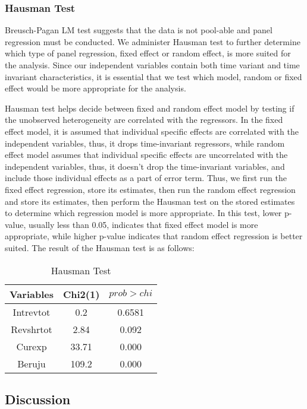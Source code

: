 \subsubsection{Hausman Test}
Breusch-Pagan LM test suggests that the data is not pool-able and panel regression must be conducted. We administer Hausman test to further determine which type of panel regression, fixed effect or random effect, is more suited for the analysis. Since our independent variables contain both time variant and time invariant characteristics, it is essential that we test which model, random or fixed effect would be more appropriate for the analysis. \par
Hausman test helps decide between fixed and random effect model by testing if the unobserved heterogeneity are correlated with the regressors. In the fixed effect model, it is assumed that individual specific effects are correlated with the independent variables, thus, it drops time-invariant regressors, while random effect model assumes that individual specific effects are uncorrelated with the independent variables, thus, it doesn't drop the time-invariant variables, and include those individual effects as a part of error term. Thus, we first run the fixed effect regression, store its estimates, then run the random effect regression and store its estimates, then perform the Hausman test on the stored estimates to determine which regression model is more appropriate. In this test, lower p-value, usually less than 0.05, indicates that fixed effect model is more appropriate, while higher p-value indicates that random effect regression is better suited. The result of the Hausman test is as follows: \par
\begin{table}[H]
  \centering
   \begin{tabular}{c|cc}
     Variables &Chi2(1) & \(prob>chi\) \\
        \hline
    Intrevtot & 0.2 &0.6581\\
    Revshrtot & 2.84 &0.092\\
    Curexp & 33.71 & 0.000\\
    Beruju & 109.2 & 0.000 \\
    \hline
    \end{tabular}
    \caption{Hausman Test }  
     \label{Hausman Test }
\end{table} 
\subsection{Discussion}

